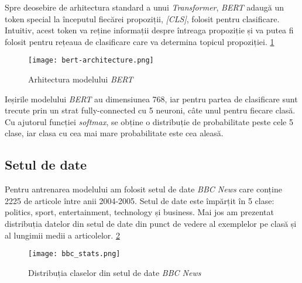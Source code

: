 \par
Spre deosebire de arhitectura standard a unui \textit{Transformer}, \textit{BERT} adaugă un token
special la începutul fiecărei propoziții, \textit{[CLS]}, folosit pentru clasificare. Intuitiv,
acest token va reține informații despre întreaga propoziție și va putea fi folosit pentru rețeaua
de clasificare care va determina topicul propoziției. \ref{fig:bert-architecture}

\begin{figure}[h]
    \centering
    \texttt{[image: bert-architecture.png]}
    \caption{Arhitectura modelului \textit{BERT} \protect\footnotemark[2]}
    \label{fig:bert-architecture}
\end{figure}
\vspace{1em}

\par
Ieșirile modelului \textit{BERT} au dimensiunea 768, iar pentru partea de clasificare sunt trecute
prin un strat fully-connected cu 5 neuroni, câte unul pentru fiecare clasă. Cu ajutorul funcției
\textit{softmax}, se obține o distribuție de probabilitate peste cele 5 clase, iar clasa cu cea mai
mare probabilitate este cea aleasă.


\vspace{1em}

\subsection{Setul de date}
\vspace{1em}
Pentru antrenarea modelului am folosit setul de date \textit{BBC News} care conține 2225 de articole 
între anii 2004-2005. Setul de date este împărțit în 5 clase: politics, sport, entertainment, technology
și business. Mai jos am prezentat distribuția datelor din setul de date din punct de vedere al exemplelor
pe clasă și al lungimii medii a articolelor. \ref{fig:bbc-stats}

\vspace{1em}

\begin{figure}[h]
    \centering
    \texttt{[image: bbc\_stats.png]}
    \caption{Distribuția claselor din setul de date \textit{BBC News}}
    \label{fig:bbc-stats}
\end{figure}


